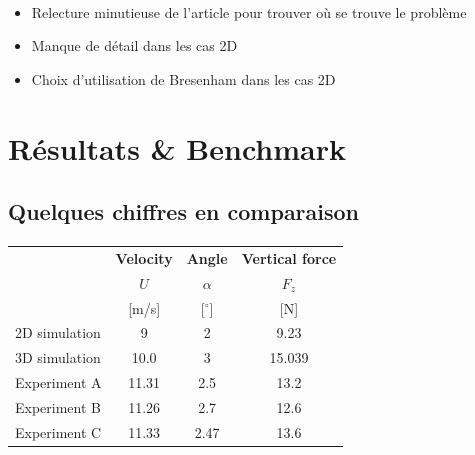 \begin{frame}[fragile=singleslide]{\insertsectionhead}
  \framesubtitle{\insertsubsectionhead}
  \begin{itemize}
    \item Relecture minutieuse de l'article pour trouver où se trouve le problème
  \end{itemize}
  \hfill
  \begin{itemize}
    \item Manque de détail dans les cas 2D
  \end{itemize}
  \hfill
  \begin{itemize}
    \item Choix d’utilisation de Bresenham dans les cas 2D
  \end{itemize}
\end{frame}

\section{Résultats \& Benchmark}

\subsection{Quelques chiffres en comparaison}

\begin{frame}[fragile=singleslide]{\insertsectionhead}
  \framesubtitle{\insertsubsectionhead}
  \begin{table}
    \centering
    \begin{tabular}{@{} lccc @{}}
      \toprule
      & \textbf{Velocity} & \textbf{Angle}  & \textbf{Vertical force} \\
      & $U$ & $\alpha$  & $F_z$ \\
      & [m/s] & [$^\circ$]  & [N] \\
      \midrule
      2D simulation  & 9 & 2 & 9.23 \\
      3D simulation  & 10.0 & 3 & 15.039 \\
      Experiment A   & 11.31 & 2.5 & 13.2 \\
      Experiment B   & 11.26 & 2.7 & 12.6 \\
      Experiment C   & 11.33 & 2.47 & 13.6 \\
      \bottomrule
    \end{tabular}
  \end{table}
\end{frame}

